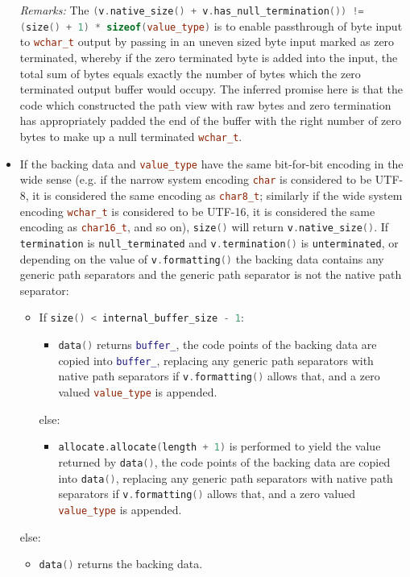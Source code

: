 \documentclass[11pt]{article}
\newcommand{\code}[2][cpp]{\lstinline[language=#1,basicstyle=\small\ttfamily]{#2}}
\newcommand{\desc}[1]{\textit{#1}}
\newcommand{\remarks}{\desc{Remarks: }}
\begin{document}
\begin{itemize}
\remarks{The \code{(v.native_size() + v.has_null_termination()) != (size() + 1) * sizeof(value_type)} is to enable passthrough of byte input to \code{wchar_t} output by passing in an uneven sized byte input marked as zero terminated, whereby if the zero terminated byte is added into the input, the total sum of bytes equals exactly the number of bytes which the zero terminated output buffer would occupy. The inferred promise here is that the code which constructed the path view with raw bytes and zero termination has appropriately padded the end of the buffer with the right number of zero bytes to make up a null terminated \code{wchar_t}.}

    \item If the backing data and \code{value_type} have the same bit-for-bit encoding in the wide sense (e.g. if the narrow system encoding \code{char} is considered to be UTF-8, it is considered the same encoding as \code{char8_t}; similarly if the wide system encoding \code{wchar_t} is considered to be UTF-16, it is considered the same encoding as \code{char16_t}, and so on), \code{size()} will return \code{v.native_size()}. If \code{termination} is \code{null_terminated} and \code{v.termination()} is \code{unterminated}, or depending on the value of \code{v.formatting()} the backing data contains any generic path separators and the generic path separator is not the native path separator:
    \begin{itemize}
        \item If \code{size() < internal_buffer_size - 1}:
        \begin{itemize}
            \item \code{data()} returns \code{buffer_}, the code points of the backing data are copied into \code{buffer_}, replacing any generic path separators with native path separators if \code{v.formatting()} allows that, and a zero valued \code{value_type} is appended. 
        \end{itemize}
        else:
        \begin{itemize}
            \item \code{allocate.allocate(length + 1)} is performed to yield the value returned by \code{data()}, the code points of the backing data are copied into \code{data()}, replacing any generic path separators with native path separators if \code{v.formatting()} allows that, and a zero valued \code{value_type} is appended.
        \end{itemize}
    \end{itemize}
    else:
    \begin{itemize}
        \item \code{data()} returns the backing data.
    \end{itemize}


\end{itemize}
\end{document}
